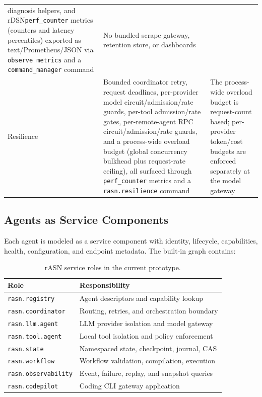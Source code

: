 \documentclass[manuscript,screen,review]{acmart}
\newcommand{\rasn}{rASN\xspace}
\newcommand{\rdsn}{rDSN\xspace}
\begin{document}
\begin{table}[t]
\begin{tabular}{p{}p{}p{}}
diagnosis helpers, and \rdsn \texttt{perf\_counter} metrics (counters and
latency percentiles) exported as text/Prometheus/JSON via \texttt{observe
metrics} and a \texttt{command\_manager} command & No bundled scrape gateway,
retention store, or dashboards \\
Resilience & Bounded coordinator retry, request deadlines, per-provider
model circuit/admission/rate guards, per-tool admission/rate gates,
per-remote-agent RPC circuit/admission/rate guards, and a process-wide overload
budget (global concurrency bulkhead plus request-rate ceiling), all surfaced
through \texttt{perf\_counter} metrics and a \texttt{rasn.resilience} command & The
process-wide overload budget is request-count based; per-provider token/cost
budgets are enforced separately at the model gateway \\
\bottomrule
\end{tabular}
\end{table}

\subsection{Agents as Service Components}

Each agent is modeled as a service component with identity, lifecycle,
capabilities, health, configuration, and endpoint metadata. The built-in graph
contains:

\begin{table}[t]
\caption{\rasn service roles in the current prototype.}
\label{tab:roles}
\centering
\begin{tabular}{ll}
\toprule
Role & Responsibility \\
\midrule
\texttt{rasn.registry} & Agent descriptors and capability lookup \\
\texttt{rasn.coordinator} & Routing, retries, and orchestration boundary \\
\texttt{rasn.llm.agent} & LLM provider isolation and model gateway \\
\texttt{rasn.tool.agent} & Local tool isolation and policy enforcement \\
\texttt{rasn.state} & Namespaced state, checkpoint, journal, CAS \\
\texttt{rasn.workflow} & Workflow validation, compilation, execution \\
\texttt{rasn.observability} & Event, failure, replay, and snapshot queries \\
\texttt{rasn.codepilot} & Coding CLI gateway application \\
\bottomrule
\end{tabular}
\end{table}
\end{document}
